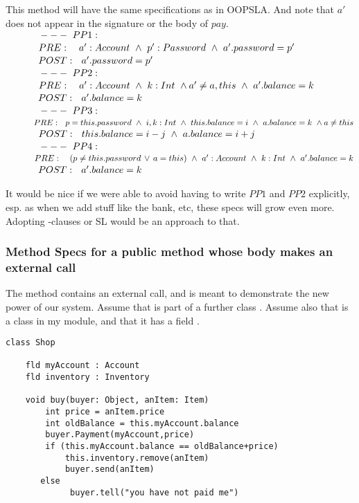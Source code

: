 This method will have the same specifications as in OOPSLA. And note that $a'$ does not appear in the signature or the body of $pay$.  \\ 
$~\strut \ \ \ \ \ \ \ \ \ ---\ PP1:$\\
$~\strut \ \ \ \ \ \ \ \ \  PRE:\ \ \ a': Account \ \wedge \  p' : Password \ \wedge \ a'.password=p' $
\\
$~\strut \ \ \ \ \ \ \ \ \  POST: \ \ a'.password=p' $
\\
$~\strut \ \ \ \ \ \ \ \ \  ---\ PP2:$\\
$\SP PRE:\ \ \ a':Account \ \wedge\ k: Int \ \wedge  a'\neq a, this\ \wedge\  a'.balance = k \ \ $\\
$\SP POST:\ \   a'.balance = k \ \ $
\\
$~\strut \ \ \ \ \ \ \ \ \  ---\ PP3:$ \\
$\SP PRE: \ \ p=this.password \ \wedge\ i,k:Int \ \wedge \ this.balance=i \ \wedge \ a.balance=k\ \wedge a\neq this$
\\
$\SP POST:\ \  this.balance=i-j \ \wedge\  a.balance = i+j \ \ $\\
$~\strut \ \ \ \ \ \ \ \ \  ---\ PP4:$\\
$~\strut \ \ \ \ \ \ \ \ \  PRE:\ \ \ ( p\neq this.password\, \vee\, a=this)\  \wedge \  a':Account \ \wedge\ k: Int\   \wedge\  a'.balance = k $\\
$~\strut \ \ \ \ \ \ \ \ \  POST: \ \ a'.balance=k$

It would be nice if we were able to avoid having to write $PP1$ and $PP2$ explicitly, esp. as when we add stuff like the bank, etc, these specs will grow even more. Adopting -clauses or SL would be an approach to that.


\subsubsection{Method Specs for a public method whose body makes an external call}
 The method  contains an external call, and is meant to demonstrate the new power of our system. Assume that 
 is part of a further class .   Assume also that  is a class in my module, and that it has a field .
 
\begin{lstlisting}
class Shop

    fld myAccount : Account
    fld inventory : Inventory
    
    void buy(buyer: Object, anItem: Item)
        int price = anItem.price
        int oldBalance = this.myAccount.balance
        buyer.Payment(myAccount,price)
        if (this.myAccount.balance == oldBalance+price)
            this.inventory.remove(anItem)
            buyer.send(anItem)
       else
             buyer.tell("you have not paid me")  
             
\end{lstlisting}

